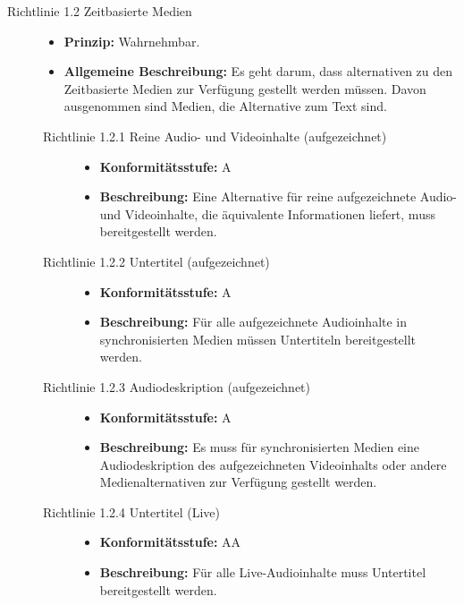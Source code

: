 \begin{description}
	\item[Richtlinie 1.2 Zeitbasierte Medien]\hfill
	\begin{itemize}
		\item \textbf{Prinzip:} Wahrnehmbar.
		\item \textbf{Allgemeine Beschreibung:} Es geht darum, dass alternativen zu den Zeitbasierte Medien zur Verfügung gestellt werden müssen. Davon ausgenommen sind 
		Medien, die Alternative zum Text sind.
	\end{itemize}
	
	\begin{description}
		\item[Richtlinie 1.2.1 Reine Audio- und Videoinhalte (aufgezeichnet)]\hfill
		\begin{itemize}
			\item \textbf{Konformitätsstufe:} A
			\item \textbf{Beschreibung:} Eine Alternative für reine aufgezeichnete Audio- und Videoinhalte, die äquivalente Informationen 
			liefert, muss bereitgestellt werden.
		\end{itemize}
			
		\item[Richtlinie 1.2.2 Untertitel (aufgezeichnet)]\hfill
		\begin{itemize}
			\item \textbf{Konformitätsstufe:} A
			\item \textbf{Beschreibung:} Für alle aufgezeichnete Audioinhalte in synchronisierten Medien müssen Untertiteln bereitgestellt werden.
		\end{itemize}
			
		\item[Richtlinie 1.2.3 Audiodeskription (aufgezeichnet)]\hfill
		\begin{itemize}
			\item \textbf{Konformitätsstufe:} A
			\item \textbf{Beschreibung:} Es muss für synchronisierten Medien eine Audiodeskription des aufgezeichneten Videoinhalts oder andere 
			Medienalternativen zur Verfügung gestellt werden.
		\end{itemize}
			
		\item[Richtlinie 1.2.4 Untertitel (Live)]\hfill
		\begin{itemize}
			\item \textbf{Konformitätsstufe:} AA
			\item \textbf{Beschreibung:} Für alle Live-Audioinhalte muss Untertitel bereitgestellt werden.
		\end{itemize}
			

\end{description}
\end{description}
